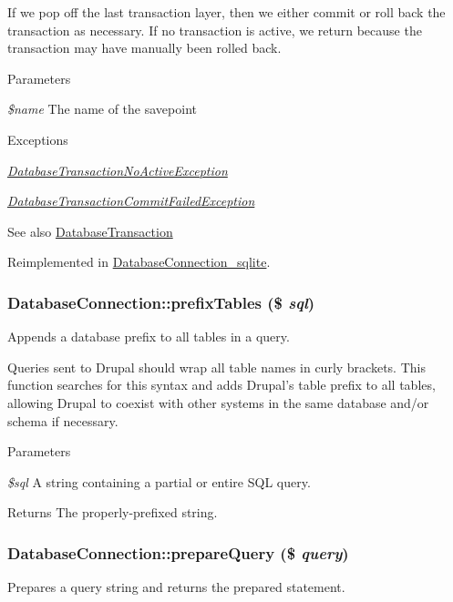 If we pop off the last transaction layer, then we either commit or roll back the transaction as necessary. If no transaction is active, we return because the transaction may have manually been rolled back.


\begin{DoxyParams}{Parameters}
\item[{\em \$name}]The name of the savepoint\end{DoxyParams}

\begin{DoxyExceptions}{Exceptions}
\item[{\em \hyperlink{classDatabaseTransactionNoActiveException}{DatabaseTransactionNoActiveException}}]\item[{\em \hyperlink{classDatabaseTransactionCommitFailedException}{DatabaseTransactionCommitFailedException}}]\end{DoxyExceptions}
\begin{DoxySeeAlso}{See also}
\hyperlink{classDatabaseTransaction}{DatabaseTransaction} 
\end{DoxySeeAlso}


Reimplemented in \hyperlink{classDatabaseConnection__sqlite_a92aff36a5e22c5f21258a6a2333121b4}{DatabaseConnection\_\-sqlite}.\hypertarget{classDatabaseConnection_a10dfbe0177bc8c79a8589cc84afe24dd}{
\subsubsection[{prefixTables}]{\setlength{\rightskip}{0pt plus 5cm}DatabaseConnection::prefixTables (\$ {\em sql})}}
\label{classDatabaseConnection_a10dfbe0177bc8c79a8589cc84afe24dd}
Appends a database prefix to all tables in a query.

Queries sent to Drupal should wrap all table names in curly brackets. This function searches for this syntax and adds Drupal's table prefix to all tables, allowing Drupal to coexist with other systems in the same database and/or schema if necessary.


\begin{DoxyParams}{Parameters}
\item[{\em \$sql}]A string containing a partial or entire SQL query.\end{DoxyParams}
\begin{DoxyReturn}{Returns}
The properly-\/prefixed string. 
\end{DoxyReturn}
\hypertarget{classDatabaseConnection_a3eb8c20adaffdd0f567bbe16d5226554}{
\subsubsection[{prepareQuery}]{\setlength{\rightskip}{0pt plus 5cm}DatabaseConnection::prepareQuery (\$ {\em query})}}
\label{classDatabaseConnection_a3eb8c20adaffdd0f567bbe16d5226554}
Prepares a query string and returns the prepared statement.

